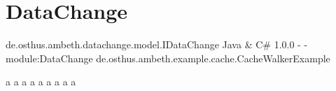 \section{DataChange}
\label{feature:DataChange}

\feature
	{de.osthus.ambeth.datachange.model.IDataChange}
	{Java \& C\#}
	{1.0.0}
	{-}
	{-}
	{module:DataChange}
	{de.osthus.ambeth.example.cache.CacheWalkerExample}
	
	a\newline
	a\newline
	a\newline
	a\newline
	a\newline
	a\newline
	a\newline
	a\newline
	a\newline